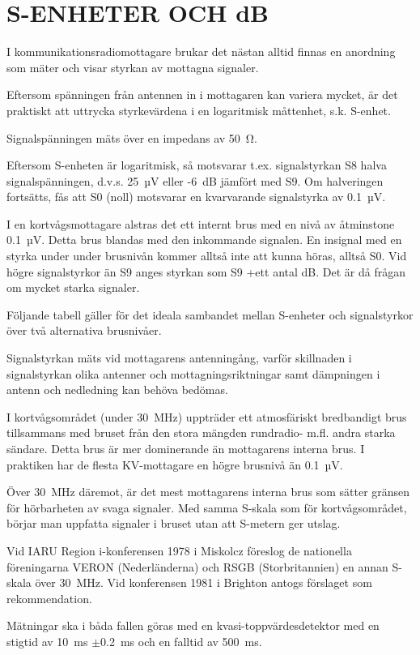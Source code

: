 \chapter{S-ENHETER OCH dB}
\label{s-enhet}

I kommunikationsradiomottagare brukar det nästan alltid finnas en
anordning som mäter och visar styrkan av mottagna signaler.

Eftersom spänningen från antennen in i mottagaren kan variera mycket,
är det praktiskt att uttrycka styrkevärdena i en logaritmisk måttenhet,
s.k. S-enhet.

Signalspänningen mäts över en impedans av 50~Ω.

Eftersom S-enheten är logaritmisk, så motsvarar t.ex. signalstyrkan
S8 halva signalspänningen, d.v.s. 25~µV eller -6~dB jämfört med S9. Om
halveringen fortsätts, fås att S0 (noll) motsvarar en kvarvarande
signalstyrka av 0.1~µV.

I en kortvågsmottagare alstras det ett internt brus med en nivå av
åtminstone 0.1~µV.  Detta brus blandas med den inkommande signalen. En
insignal med en styrka under under brusnivån kommer alltså inte att
kunna höras, alltså S0. Vid högre signalstyrkor än S9 anges styrkan
som S9 +ett antal dB. Det är då frågan om mycket starka signaler.

Följande tabell gäller för det ideala sambandet mellan S-enheter och
signalstyrkor över två alternativa brusnivåer.

Signalstyrkan mäts vid mottagarens antenningång, varför skillnaden i
signalstyrkan olika antenner och mottagningsriktningar samt dämpningen
i antenn och nedledning kan behöva bedömas.

I kortvågsområdet (under 30~MHz) uppträder ett atmosfäriskt
bredbandigt brus tillsammans med bruset från den stora mängden
rundradio- m.fl. andra starka sändare. Detta brus är mer dominerande
än mottagarens interna brus. I praktiken har de flesta KV-mottagare en
högre brusnivå än 0.1~µV.

Över 30~MHz däremot, är det mest mottagarens interna brus som sätter
gränsen för hörbarheten av svaga signaler. Med samma S-skala som för
kortvågsområdet, börjar man uppfatta signaler i bruset utan att
S-metern ger utslag.

Vid IARU Region i-konferensen 1978 i Miskolcz föreslog de nationella
föreningarna VERON (Nederländerna) och RSGB (Storbritannien) en annan
S-skala över 30~MHz.  Vid konferensen 1981 i Brighton antogs förslaget
som rekommendation.

Mätningar ska i båda fallen göras med en kvasi-toppvärdesdetektor
med en stigtid av 10~ms \(\pm\)0.2~ms och en falltid av 500~ms.

